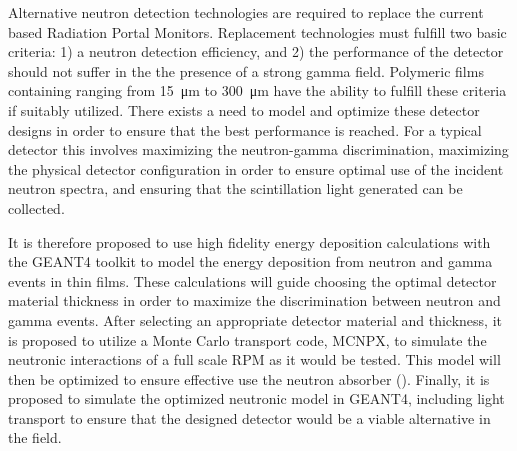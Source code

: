 Alternative neutron detection technologies are required to replace the current  based Radiation Portal Monitors.
Replacement technologies must fulfill two basic criteria: 1) a neutron detection efficiency, and 2) the performance of the detector should not suffer in the the presence of a strong gamma field.
Polymeric films containing  ranging from \SI{15}{\um} to \SI{300}{\um} have the ability to fulfill these criteria if suitably utilized.
There exists a need to model and optimize these detector designs in order to ensure that the best performance is reached. 
For a typical detector this involves maximizing the neutron-gamma discrimination, maximizing the physical detector configuration in order to ensure optimal use of the incident neutron spectra, and ensuring that the scintillation light generated can be collected.

It is therefore proposed to use high fidelity energy deposition calculations with the GEANT4 toolkit to model the energy deposition from neutron and gamma events in thin films.
These calculations will guide choosing the optimal detector material thickness in order to maximize the discrimination between neutron and gamma events.
After selecting an appropriate detector material and thickness, it is proposed to utilize a Monte Carlo transport code, MCNPX, to simulate the neutronic interactions of a full scale RPM as it would be tested.
This model will then be optimized to ensure effective use the neutron absorber ().
Finally, it is proposed to simulate the optimized neutronic model in GEANT4, including light transport to ensure that the designed detector would be a viable alternative in the field.
